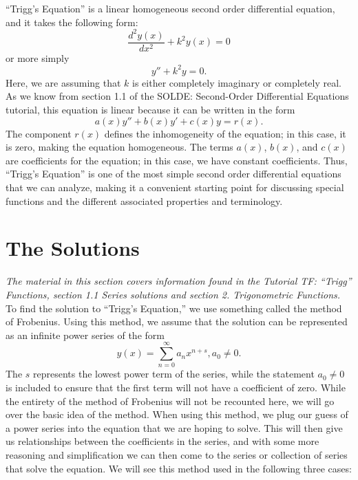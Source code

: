 \documentclass[11pt]{report}
\begin{document}
``Trigg's Equation'' is a linear homogeneous second order differential equation, and it takes the following form:
    \begin{equation}
        \frac{d^2y(x)}{dx^2}  + k^2y(x) = 0
    \end{equation}
or more simply 
    \begin{equation*}
        y'' + k^2y = 0.
    \end{equation*}
Here, we are assuming that $k$ is either completely imaginary or completely real. As we know from section 1.1 of the SOLDE: Second-Order Differential Equations tutorial, this equation is linear because it can be written in the form 
    \begin{equation*}
        a(x)y'' + b(x)y' + c(x)y = r(x).
    \end{equation*}
The component $r(x)$ defines the inhomogeneity of the equation; in this case, it is zero, making the equation homogeneous.  The terms $a(x)$, $b(x)$, and $c(x)$ are coefficients for the equation; in this case, we have constant coefficients. Thus, ``Trigg's Equation'' is one of the most simple second order differential equations that we can analyze, making it a convenient starting point for discussing special functions and the different associated properties and terminology.



\section{The Solutions}

\emph{The material in this section covers information found in the Tutorial TF: “Trigg” Functions, section 1.1 Series solutions and section 2. Trigonometric Functions.}\\

To find the solution to ``Trigg's Equation,'' we use something called the method of Frobenius. Using this method, we assume that the solution can be represented as an infinite power series of the form
    \begin{equation*}
        y(x) = \sum_{n=0}^\infty a_n x^{n+s}, a_0\neq 0.
    \end{equation*}
The $s$ represents the lowest power term of the series, while the statement $a_0\neq0$ is included to ensure that the first term will not have a coefficient of zero. While the entirety of the method of Frobenius will not be recounted here, we will go over the basic idea of the method. When using this method, we plug our guess of a power series into the equation that we are hoping to solve. This will then give us relationships between the coefficients in the series, and with some more reasoning and simplification we can then come to the series or collection of series that solve the equation. We will see this method used in the following three cases:
\end{document}
